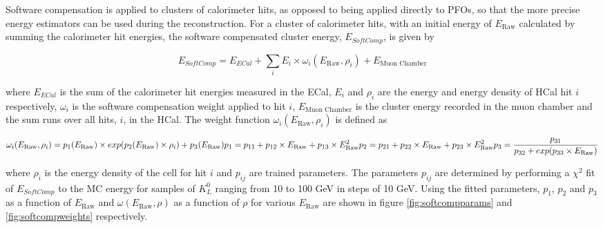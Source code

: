 Software compensation is applied to clusters of calorimeter hits, as opposed to being applied directly to PFOs, so that the more precise energy estimators can be used during the reconstruction.  For a cluster of calorimeter hits, with an initial energy of $E_{\text{Raw}}$ calculated by summing the calorimeter hit energies, the software compensated cluster energy, $E_{SoftComp}$, is given by 

\begin{equation}
E_{SoftComp} = E_{ECal} + \sum_{i} E_{i} \times \omega_{i}(E_{\text{Raw}}, \rho_{i}) + E_{\text{Muon Chamber}}
\label{equ:softcomp}
\end{equation}

where $E_{ECal}$ is the sum of the calorimeter hit energies measured in the ECal, $E_{i}$ and $\rho_{i}$ are the energy and energy density of HCal hit $i$ respectively, $\omega_{i}$ is the software compensation weight applied to hit $i$, $E_{\text{Muon Chamber}}$ is the cluster energy recorded in the muon chamber and the sum runs over all hits, $i$, in the HCal.  The weight function $\omega_{i}(E_{\text{Raw}}, \rho_{i})$ is defined as

\begin{equation}
\omega_{i}(E_{\text{Raw}}, \rho_{i}) = p_{1}(E_{\text{Raw}}) \times exp(p_{2}(E_{\text{Raw}}) \times \rho_{i}) + p_{3}(E_{\text{Raw}}) \\
p_{1} = p_{11} + p_{12} \times E_{\text{Raw}} + p_{13} \times E_{\text{Raw}}^{2} \\
p_{2} = p_{21} + p_{22} \times E_{\text{Raw}} + p_{23} \times E_{\text{Raw}}^{2} \\
p_{3} = \frac{p_{31}}{p_{32} + exp(p_{33} \times E_{\text{Raw}})}
\label{equ:softcompweight}
\end{equation}

where $\rho_{i}$ is the energy density of the cell for hit $i$ and $p_{ij}$ are trained parameters.  The parameters $p_{ij}$ are determined by performing a $\chi^{2}$ fit of $E_{SoftComp}$ to the MC energy for samples of $K^{0}_{L}$ ranging from 10 to 100 GeV in steps of 10 GeV.  Using the fitted parameters, $p_{1}$,  $p_{2}$ and $p_{3}$ as a function of $E_{\text{Raw}}$ and $\omega(E_{\text{Raw}}, \rho)$ as a function of $\rho$ for various $E_{\text{Raw}}$ are shown in figure \ref{fig:softcompparams} and \ref{fig:softcompweights} respectively.  

